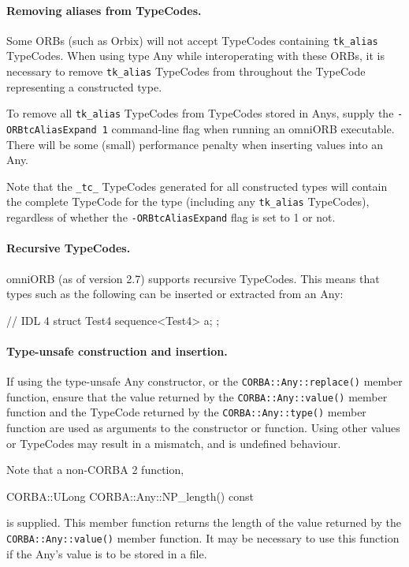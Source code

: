 \documentclass[11pt,twoside,a4paper]{book}
\newcommand{\code}[1]{\texttt{#1}}
\newcommand{\op}[1]{\texttt{#1()}}
\begin{document}
\paragraph*{Removing aliases from TypeCodes.}
Some ORBs (such as Orbix) will not accept TypeCodes containing
\code{tk\_alias} TypeCodes. When using type Any while interoperating
with these ORBs, it is necessary to remove \code{tk\_alias} TypeCodes
from throughout the TypeCode representing a constructed type.

To remove all \code{tk\_alias} TypeCodes from TypeCodes stored in
Anys, supply the \texttt{-ORBtcAliasExpand 1} command-line flag when
running an omniORB executable. There will be some (small) performance
penalty when inserting values into an Any.

Note that the \code{\_tc\_} TypeCodes generated for all constructed
types will contain the complete TypeCode for the type (including any
\code{tk\_alias} TypeCodes), regardless of whether the
\texttt{-ORBtcAliasExpand} flag is set to 1 or not.

\paragraph*{Recursive TypeCodes.}
omniORB (as of version 2.7) supports recursive TypeCodes. This means
that types such as the following can be inserted or extracted from an
Any:

\begin{idllisting}
// IDL 4
struct Test4 {
  sequence<Test4> a;
};
\end{idllisting}

\paragraph*{Type-unsafe construction and insertion.}
If using the type-unsafe Any constructor, or the
\op{CORBA::Any::replace} member function, ensure that the value
returned by the \op{CORBA::Any::value} member function and the
TypeCode returned by the \op{CORBA::Any::type} member function are
used as arguments to the constructor or function. Using other values
or TypeCodes may result in a mismatch, and is undefined behaviour.

Note that a non-CORBA 2 function,

\begin{cxxlisting}
CORBA::ULong CORBA::Any::NP_length() const
\end{cxxlisting}

is supplied. This member function returns the length of the value
returned by the \op{CORBA::Any::value} member function. It may be
necessary to use this function if the Any's value is to be stored in a
file.
\end{document}
